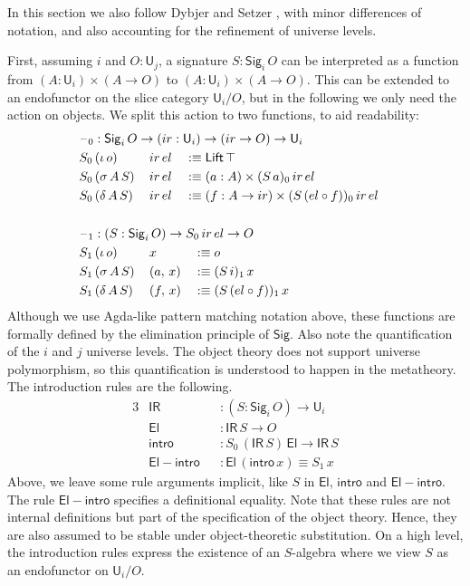 \documentclass[acmsmall,screen,review,anonymous]{acmart}
\newcommand{\msf}[1]{{\mathsf{#1}}}
\newcommand{\U}{\msf{U}}
\newcommand{\El}{\msf{El}}
\newcommand{\Lift}{\msf{Lift}}
\newcommand{\Sig}{\msf{Sig}}
\newcommand{\blank}{{\mathord{\hspace{1pt}\text{--}\hspace{1pt}}}}
\newcommand{\ir}{{ir}}
\newcommand{\el}{{el}}
\newcommand{\IR}{\msf{IR}}
\newcommand{\intro}{\msf{intro}}
\begin{document}
In this section we also follow Dybjer and Setzer \cite{TODO}, with minor differences of notation, and
also accounting for the refinement of universe levels.

First, assuming $i$ and $O : \U_j$, a signature $S : \Sig_i\,O$ can be interpreted as a function
from $(A : \U_i) \times (A \to O)$ to $(A : \U_i) \times (A \to O)$. This can be extended to an
endofunctor on the slice category $\U_i/O$, but in the following we only need the action on
objects. We split this action to two functions, to aid readability:
\begin{alignat*}{3}
  &\rlap{$\blank_0 : \Sig_i\,O \to (\ir : \U_i) \to (\ir \to O) \to \U_i$} \\
  &S_0\,(\iota\,o)    \,&&\ir\,\el && \hspace{-0.7em}:\equiv \Lift\,\top\\
  &S_0\,(\sigma\,A\,S)\,&&\ir\,\el && \hspace{-0.7em}:\equiv (a : A) \times (S\,a)_0\,\ir\,\el\\
  &S_0\,(\delta\,A\,S)\,&&\ir\,\el && \hspace{-0.7em}:\equiv (f : A \to \ir) \times (S\,(\el \circ f))_0\,\ir\,\el\\
  & && &&\\
  &\rlap{$\blank_1 : (S : \Sig_i\,O) \to S_0\,\ir\,\el \to O$} \\
  &S_1\,(\iota\,o)    \,&&x       && :\equiv o\\
  &S_1\,(\sigma\,A\,S)\,&&(a,\,x) && :\equiv (S\,i)_1\,x\\
  &S_1\,(\delta\,A\,S)\,&&(f,\,x) && :\equiv (S\,(\el \circ f))_1\,x
\end{alignat*}
Although we use Agda-like pattern matching notation above, these functions are formally defined by
the elimination principle of $\Sig$. Also note the quantification of the $i$ and $j$ universe
levels. The object theory does not support universe polymorphism, so this quantification is
understood to happen in the metatheory. The introduction rules are the following.
\begin{alignat*}{3}
  &\IR                && : (S : \Sig_i\,O) \to \U_i\\
  &\El                && : \IR\,S \to O\\
  &\intro             && : S_0\,(\IR\,S)\,\El \to \IR\,S\\
  &\msf{El\!\!-\!\!intro} && : \El\,(\intro\,x) \equiv S_1\,x
\end{alignat*}
Above, we leave some rule arguments implicit, like $S$ in $\El$, $\intro$ and
$\msf{El\!\!-\!\!intro}$. The rule $\msf{El\!\!-\!\!intro}$ specifies a definitional equality.  Note
that these rules are not internal definitions but part of the specification of the object
theory. Hence, they are also assumed to be stable under object-theoretic substitution. On a high
level, the introduction rules express the existence of an $S$-algebra where we view $S$ as an
endofunctor on $\U_i/O$.
\end{document}
